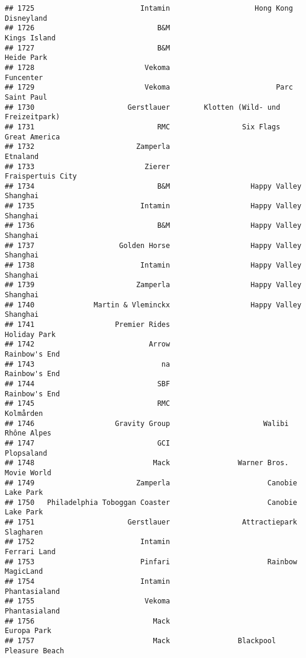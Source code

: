 \documentclass[
]{article}
\begin{document}
\begin{verbatim}
## 1725                         Intamin                    Hong Kong Disneyland
## 1726                             B&M                            Kings Island
## 1727                             B&M                              Heide Park
## 1728                          Vekoma                               Funcenter
## 1729                          Vekoma                         Parc Saint Paul
## 1730                      Gerstlauer        Klotten (Wild- und Freizeitpark)
## 1731                             RMC                 Six Flags Great America
## 1732                        Zamperla                                Etnaland
## 1733                          Zierer                       Fraispertuis City
## 1734                             B&M                   Happy Valley Shanghai
## 1735                         Intamin                   Happy Valley Shanghai
## 1736                             B&M                   Happy Valley Shanghai
## 1737                    Golden Horse                   Happy Valley Shanghai
## 1738                         Intamin                   Happy Valley Shanghai
## 1739                        Zamperla                   Happy Valley Shanghai
## 1740              Martin & Vleminckx                   Happy Valley Shanghai
## 1741                   Premier Rides                            Holiday Park
## 1742                           Arrow                           Rainbow's End
## 1743                              na                           Rainbow's End
## 1744                             SBF                           Rainbow's End
## 1745                             RMC                               Kolmården
## 1746                   Gravity Group                      Walibi Rhône Alpes
## 1747                             GCI                              Plopsaland
## 1748                            Mack                Warner Bros. Movie World
## 1749                        Zamperla                       Canobie Lake Park
## 1750   Philadelphia Toboggan Coaster                       Canobie Lake Park
## 1751                      Gerstlauer                 Attractiepark Slagharen
## 1752                         Intamin                            Ferrari Land
## 1753                         Pinfari                       Rainbow MagicLand
## 1754                         Intamin                           Phantasialand
## 1755                          Vekoma                           Phantasialand
## 1756                            Mack                             Europa Park
## 1757                            Mack                Blackpool Pleasure Beach

\end{verbatim}
\end{document}
